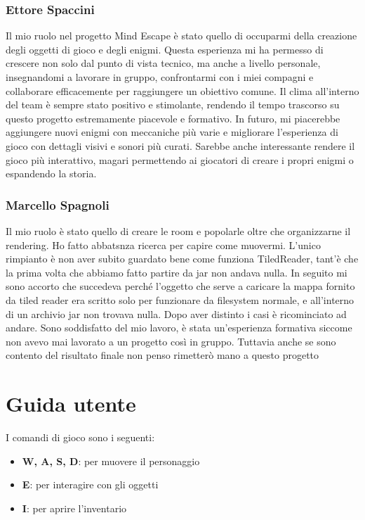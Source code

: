 \documentclass[a4paper,12pt]{report}
\begin{document}
\subsection{Ettore Spaccini}
Il mio ruolo nel progetto Mind Escape è stato quello di occuparmi della creazione degli oggetti di gioco e degli enigmi. Questa esperienza mi ha permesso di crescere non solo dal punto di vista tecnico, ma anche a livello personale, insegnandomi a lavorare in gruppo, confrontarmi con i miei compagni e collaborare efficacemente per raggiungere un obiettivo comune. Il clima all'interno del team è sempre stato positivo e stimolante, rendendo il tempo trascorso su questo progetto estremamente piacevole e formativo.
In futuro, mi piacerebbe aggiungere nuovi enigmi con meccaniche più varie e migliorare l'esperienza di gioco con dettagli visivi e sonori più curati. Sarebbe anche interessante rendere il gioco più interattivo, magari permettendo ai giocatori di creare i propri enigmi o espandendo la storia.

\subsection{Marcello Spagnoli}
Il mio ruolo è stato quello di creare le room e popolarle oltre che organizzarne il rendering. Ho fatto abbatsnza ricerca per capire come muovermi. L'unico rimpianto è non aver subito guardato bene come funziona TiledReader, tant'è che la prima volta che abbiamo fatto partire da jar non andava nulla.
In seguito mi sono accorto che succedeva perché l'oggetto che serve a caricare la mappa fornito da tiled reader era scritto solo per funzionare da filesystem normale, e all'interno di un archivio jar non trovava nulla. Dopo aver distinto i casi è ricominciato ad andare.
Sono soddisfatto del mio lavoro, è stata un'esperienza formativa siccome non avevo mai lavorato a un progetto così in gruppo. Tuttavia anche se sono contento del risultato finale non penso rimetterò mano a questo progetto


\appendix
\chapter{Guida utente}

I comandi di gioco sono i seguenti:
\begin{itemize}
	\item \textbf{W, A, S, D}: per muovere il personaggio
	\item \textbf{E}: per interagire con gli oggetti
	\item \textbf{I}: per aprire l'inventario
\end{itemize}
\end{document}
